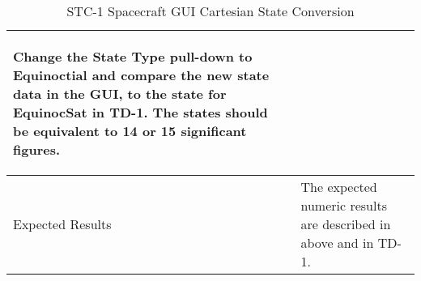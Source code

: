 \begin{table}[htbp!]
\begin{tabular}{|p{1.05 in} |p{4.75 in} |}
\begin{compactenum}
       \item     Change the State Type pull-down to Equinoctial and compare the new state data in the GUI, to the state for EquinocSat in TD-1.  The states should be equivalent to 14 or 15 significant figures.
         \end{compactenum}\\
         \hline
         Expected Results & The expected numeric results are described in above and in TD-1.\\
      \hline
\end{tabular}
      \label{Table: STC-1}
      \caption{STC-1 Spacecraft GUI Cartesian State Conversion}
\end{table} 